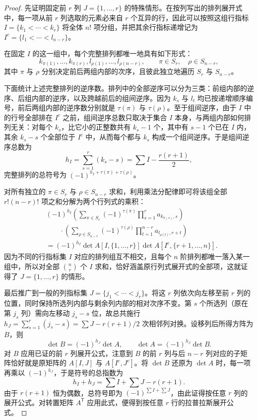 \documentclass[UTF8, fontset=fandol, a4paper, 12pt]{ctexart}
\theoremstyle{definition}
\begin{document}
\begin{proof}
先证明固定前 $r$ 列 $J=\{1,\ldots,r\}$ 的特殊情形。在按列写出的排列展开式中，每一项从前 $r$ 列选取的元素必来自 $r$ 个互异的行，因此可以按照这组行指标 $I=\{k_1<\cdots<k_r\}$ 将全体 $n!$ 项分组，并把其余行指标递增记为 $I^c=\{l_1<\cdots<l_{n-r}\}$。

在固定 $I$ 的这一组中，每个完整排列都唯一地具有如下形式：
\[
 k_{\pi(1)},\ldots,k_{\pi(r)},
 l_{\rho(1)},\ldots,l_{\rho(n-r)},
 \qquad \pi\in S_r,\quad\rho\in S_{n-r},
\]
其中 $\pi$ 与 $\rho$ 分别决定前后两组内部的次序，且彼此独立地遍历 $S_r$ 与 $S_{n-r}$。

下面统计上述完整排列的逆序数。排列中的全部逆序可以分为三类：前组内部的逆序、后组内部的逆序，以及跨越前后的组间逆序。因为 $k_s$ 与 $l_t$ 均已按递增顺序编号，前后两组内部的逆序数分别就是 $\tau(\pi)$ 与 $\tau(\rho)$。至于组间逆序，由于 $I$ 中的行号全部排在 $I^c$ 之前，组间逆序总数只取决于集合 $I$ 本身，与两组内部如何排列无关：对每个 $k_s$，比它小的正整数共有 $k_s-1$ 个，其中有 $s-1$ 个已在 $I$ 内，其余 $k_s-s$ 个全部位于 $I^c$ 中，从而每个都与 $k_s$ 构成一个组间逆序。于是组间逆序总数为
\[
 h_I=\sum_{s=1}^r(k_s-s)=\sum I-\frac{r(r+1)}2,
\]
完整排列的总符号为 $(-1)^{h_I+\tau(\pi)+\tau(\rho)}$。

对所有独立的 $\pi\in S_r$ 与 $\rho\in S_{n-r}$ 求和，利用乘法分配律即可将该组全部 $r!(n-r)!$ 项之和分解为两个行列式的乘积：
\begin{align*}
 &(-1)^{h_I}
 \left(\sum_{\pi\in S_r}(-1)^{\tau(\pi)}
             \prod_{s=1}^r a_{k_{\pi(s)},s}\right)\\
 &\qquad\cdot
 \left(\sum_{\rho\in S_{n-r}}(-1)^{\tau(\rho)}
             \prod_{t=1}^{n-r}a_{l_{\rho(t)},r+t}\right)\\
 &=(-1)^{h_I}
   \det A[I,\{1,\ldots,r\}]\det A[I^c,\{r+1,\ldots,n\}].
\end{align*}
因为不同的行指标集 $I$ 对应的排列组互不相交，且每个 $n$ 阶排列都唯一落入某一组中，所以对全部 $\binom nr$ 个 $I$ 求和，恰好涵盖原行列式展开式的全部项，这就证得了 $J=\{1,\ldots,r\}$ 的情形。

最后推广到一般的列指标集 $J=\{j_1<\cdots<j_r\}$。将这 $r$ 列依次向左移至前 $r$ 列的位置，同时保持所选列内部与剩余列内部的相对次序不变。第 $s$ 个所选列（原在第 $j_s$ 列）需向左移动 $j_s-s$ 位，故总共施行 $h_J=\sum_{s=1}^r(j_s-s)=\sum J-r(r+1)/2$ 次相邻列对换。设移列后所得方阵为 $B$，则
\[
 \det B=(-1)^{h_J}\det A,\qquad \det A=(-1)^{h_J}\det B.
\]
对 $B$ 应用已证的前 $r$ 列展开公式，注意到 $B$ 的前 $r$ 列与后 $n-r$ 列对应的子矩阵恰好就是原矩阵的 $A[I,J]$ 与 $A[I^c,J^c]$。将 $\det B$ 还原为 $\det A$ 时，每一项再乘以 $(-1)^{h_J}$，于是符号的总指数为
\[
 h_I+h_J=\sum I+\sum J-r(r+1).
\]
由于 $r(r+1)$ 恒为偶数，总符号即为 $(-1)^{\sum I+\sum J}$，由此证得按任意 $r$ 列的展开公式。对转置矩阵 $A^{\mathsf T}$ 应用此式，便得到按任意 $r$ 行的拉普拉斯展开公式。
\end{proof}
\end{document}
